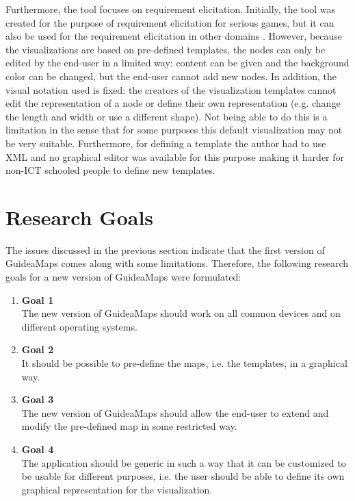 Furthermore, the tool focuses on requirement elicitation. Initially, the tool was created for the purpose of requirement elicitation for serious games, but it can also be used for the requirement elicitation in other domains \citep{detroyerjanssens}. However, because the visualizations are based on pre-defined templates, the nodes can only be edited by the end-user in a limited way: content can be given and the background color can be changed, but the end-user cannot add new nodes. In addition, the visual notation used is fixed: the creators of the visualization templates cannot edit the representation of a node or define their own representation (e.g. change the length and width or use a different shape). Not being able to do this is a limitation in the sense that for some purposes this default visualization may not be very suitable. Furthermore, for defining a template the author had to use XML and no graphical editor was available for this purpose making it harder for non-ICT schooled people to define new templates.





\section{Research Goals}\label{sec:research-goals}
The issues discussed in the previous section indicate that the first version of GuideaMaps comes along with some limitations. Therefore, the following research goals for a new version of GuideaMaps were formulated:

\begin{enumerate}[label={\textcolor{white}{\arabic*}},ref=Research Goal \arabic*]
	\item \hspace*{-2.5em}\textbf{Goal 1\label{goal:device-os-independent}} \hfill \\
	The new version of GuideaMaps should work on all common devices and on different operating systems.
	
	\item \hspace*{-2.5em}\textbf{Goal 2\label{goal:templates-graphical}} \hfill \\
	It should be possible to pre-define the maps, i.e. the templates, in a graphical way.
	
	\item \hspace*{-2.5em}\textbf{Goal 3\label{goal:extend-modify}} \hfill \\
	The new version of GuideaMaps should allow the end-user to extend and modify the pre-defined map in some restricted way.
	
	\item \hspace*{-2.5em}\textbf{Goal 4\label{goal:generic}} \hfill \\
	The application should be generic in such a way that it can be customized to be usable for different purposes, i.e. the user should be able to define its own graphical representation for the visualization.
\end{enumerate}

